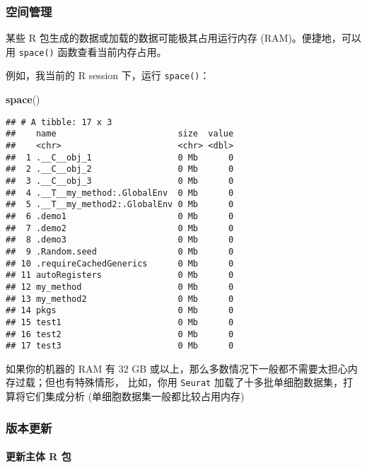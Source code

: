 \documentclass[
]{article}
\newenvironment{Shaded}{\begin{snugshade}}{\end{snugshade}}
\newcommand{\KeywordTok}[1]{\textcolor[rgb]{0.13,0.29,0.53}{\textbf{#1}}}
\newcommand{\NormalTok}[1]{#1}
\begin{document}
\hypertarget{ux7a7aux95f4ux7ba1ux7406}{%
\subsubsection{空间管理}\label{ux7a7aux95f4ux7ba1ux7406}}

某些 R 包生成的数据或加载的数据可能极其占用运行内存 (RAM)。便捷地，可以用 \texttt{space()} 函数查看当前内存占用。

例如，我当前的 R session 下，运行 \texttt{space()}：

\begin{Shaded}
\begin{Highlighting}[]
\KeywordTok{space}\NormalTok{()}
\end{Highlighting}
\end{Shaded}

\begin{verbatim}
## # A tibble: 17 x 3
##    name                        size  value
##    <chr>                       <chr> <dbl>
##  1 .__C__obj_1                 0 Mb      0
##  2 .__C__obj_2                 0 Mb      0
##  3 .__C__obj_3                 0 Mb      0
##  4 .__T__my_method:.GlobalEnv  0 Mb      0
##  5 .__T__my_method2:.GlobalEnv 0 Mb      0
##  6 .demo1                      0 Mb      0
##  7 .demo2                      0 Mb      0
##  8 .demo3                      0 Mb      0
##  9 .Random.seed                0 Mb      0
## 10 .requireCachedGenerics      0 Mb      0
## 11 autoRegisters               0 Mb      0
## 12 my_method                   0 Mb      0
## 13 my_method2                  0 Mb      0
## 14 pkgs                        0 Mb      0
## 15 test1                       0 Mb      0
## 16 test2                       0 Mb      0
## 17 test3                       0 Mb      0
\end{verbatim}

如果你的机器的 RAM 有 32 GB 或以上，那么多数情况下一般都不需要太担心内存过载；但也有特殊情形，
比如，你用 \texttt{Seurat} 加载了十多批单细胞数据集，打算将它们集成分析 (单细胞数据集一般都比较占用内存)

\hypertarget{ux7248ux672cux66f4ux65b0}{%
\subsubsection{版本更新}\label{ux7248ux672cux66f4ux65b0}}

\hypertarget{ux66f4ux65b0ux4e3bux4f53-r-ux5305}{%
\paragraph{更新主体 R 包}\label{ux66f4ux65b0ux4e3bux4f53-r-ux5305}}
\end{document}
